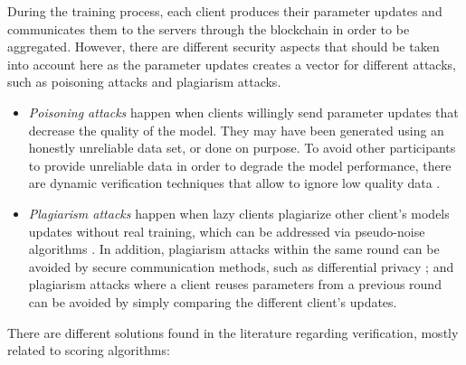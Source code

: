 During the training process, each client produces their parameter updates and communicates them to the servers through the blockchain in order to be aggregated. However, there are different security aspects that should be taken into account here as the parameter updates creates a vector for different attacks, such as poisoning attacks and plagiarism attacks.

\begin{itemize}
    \item \textit{Poisoning attacks} happen when clients willingly send parameter updates that decrease the quality of the model. They may have been generated using an honestly unreliable data set, or done on purpose. To avoid other participants to provide unreliable data in order to degrade the model performance, there are dynamic verification techniques that allow to ignore low quality data \cite{10.48550/arxiv.2110.02182, 10.48550/arxiv.2104.10501}.
    
    \item \textit{Plagiarism attacks} happen when lazy clients plagiarize other client's models updates without real training, which can be addressed via pseudo-noise algorithms \cite{9403374}. In addition, plagiarism attacks within the same round can be avoided by secure communication methods, such as differential privacy \cite{10.48550/arxiv.2009.09338}; and plagiarism attacks where a client reuses parameters from a previous round can be avoided by simply comparing the different client's updates.
\end{itemize}

There are different solutions found in the literature regarding verification, mostly related to scoring algorithms:

